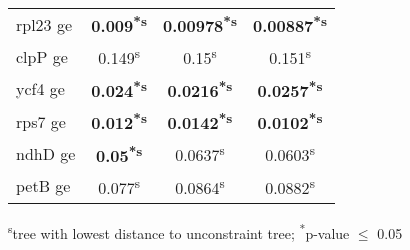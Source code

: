 \documentclass[a4paper]{article}
\begin{document}
\begin{longtable}{l|c|c|c}
rpl23 ge&\textbf{0.009\textsuperscript{*}\textsuperscript{s}}&\textbf{0.00978\textsuperscript{*}\textsuperscript{s}}&\textbf{0.00887\textsuperscript{*}\textsuperscript{s}}\\
clpP ge&0.149\textsuperscript{s}&0.15\textsuperscript{s}&0.151\textsuperscript{s}\\
ycf4 ge&\textbf{0.024\textsuperscript{*}\textsuperscript{s}}&\textbf{0.0216\textsuperscript{*}\textsuperscript{s}}&\textbf{0.0257\textsuperscript{*}\textsuperscript{s}}\\
rps7 ge&\textbf{0.012\textsuperscript{*}\textsuperscript{s}}&\textbf{0.0142\textsuperscript{*}\textsuperscript{s}}&\textbf{0.0102\textsuperscript{*}\textsuperscript{s}}\\
ndhD ge&\textbf{0.05\textsuperscript{*}\textsuperscript{s}}&0.0637\textsuperscript{s}&0.0603\textsuperscript{s}\\
petB ge&0.077\textsuperscript{s}&0.0864\textsuperscript{s}&0.0882\textsuperscript{s}\\
\end{longtable}
\textsuperscript{s}tree with lowest distance to unconstraint tree; \textsuperscript{*}p-value $\leq$ 0.05
\end{document}
